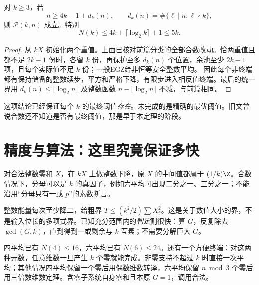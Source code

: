 \begin{theorem}[任意元数的已证尾部]
对 $k\ge3$，若
\[n\ge4k-1+d_k(n),\qquad d_k(n)=\#\{\ell\mid n:\ell\nmid k\},
\]
则 $\mathcal P(k,n)$ 成立。特别
\[N(k)\le4k+\lceil\log_2k\rceil+1\le5k.
\]
\end{theorem}
\begin{proof}
从 $kX$ 初始化两个重值。上面已核对前篇分类的全部合数改动。恰两重值且都不足 $2k-1$ 份时，各留 $k$ 份，再保护至多 $d_k(n)$ 个位置，余池至少 $2k-1$ 项，且每个实际值不足 $k$ 份；一般EGZ给非恒等安全整数平均。
因此每个非终端都有保持储备的整数续步，平方和严格下降，有限步进入相反值终端。最后的统一界用 $d_k(n)\le\lfloor\log_2n\rfloor$ 及整数函数 $n-\lfloor\log_2n\rfloor$ 不减，与前篇相同。
\end{proof}

这项结论已经保证每个 $k$ 的最终阈值\emph{存在}。未完成的是精确的最优阈值。旧文曾说合数还不知道是否有最终阈值，那是早于本定理的阶段。

\section{精度与算法：这里究竟保证多快}
对合法整数零和 $X$，在 $kX$ 上做整数下降，原 $X$ 的中间值都属于 $(1/k)\Z$。合数情况下，分母可以是 $k$ 的真因子，例如六平均可出现二分之一、三分之一；不能沿用“分母只有一或 $p$”的素数断言。

整数能量每次至少降二，给粗界 $T\le(k^2/2)\sum X_i^2$。这是关于数值大小的界，不是输入位长的多项式界。已知充分范围内的\emph{判定}则很快：算 $G$，反复除去 $\gcd(G,k)$，直到得到一或剩余与 $k$ 互素；不需要分解巨大 $G$。

四平均已有 $N(4)\le16$，六平均已有 $N(6)\le24$。还有一个方便终端：对这两种元数，任意维数一旦产生 $k$ 个零就能完成。非零支持不超过 $k$ 时直接一次平均；其他情况四平均保留一个零后用偶数维数转译，六平均保留 $n\bmod3$ 个零后用三倍数维数定理。含零子系统自身零和且本原 $G=1$，调用合法。
